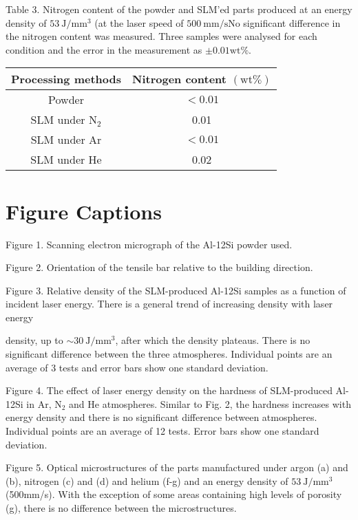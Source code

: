\documentclass[10pt]{article}
\begin{document}
Table 3. Nitrogen content of the powder and SLM'ed parts produced at an energy density of $53 \mathrm{~J} / \mathrm{mm}^{3}$ (at the laser speed of $500 \mathrm{~mm} / \mathrm{sNo}$ significant difference in the nitrogen content was measured. Three samples were analysed for each condition and the error in the measurement as $\pm 0.01 \mathrm{wt} \%$.

\begin{center}
\begin{tabular}{cc}
\hline
Processing methods & Nitrogen content $(\mathrm{wt} \%)$ \\
\hline
Powder & $<0.01$ \\
SLM under $\mathrm{N}_{2}$ & 0.01 \\
SLM under Ar & $<0.01$ \\
SLM under He & 0.02 \\
\hline
\end{tabular}
\end{center}

\section*{Figure Captions}
Figure 1. Scanning electron micrograph of the Al-12Si powder used.

Figure 2. Orientation of the tensile bar relative to the building direction.

Figure 3. Relative density of the SLM-produced Al-12Si samples as a function of incident laser energy. There is a general trend of increasing density with laser energy

density, up to $\sim 30 \mathrm{~J} / \mathrm{mm}^{3}$, after which the density plateaus. There is no significant difference between the three atmospheres. Individual points are an average of 3 tests and error bars show one standard deviation.

Figure 4. The effect of laser energy density on the hardness of SLM-produced Al-12Si in Ar, $\mathrm{N}_{2}$ and $\mathrm{He}$ atmospheres. Similar to Fig. 2, the hardness increases with energy density and there is no significant difference between atmospheres. Individual points are an average of 12 tests. Error bars show one standard deviation.

Figure 5. Optical microstructures of the parts manufactured under argon (a) and (b), nitrogen (c) and (d) and helium (f-g) and an energy density of $53 \mathrm{~J} / \mathrm{mm}^{3}$ (500mm/s). With the exception of some areas containing high levels of porosity (g), there is no difference between the microstructures.
\end{document}
